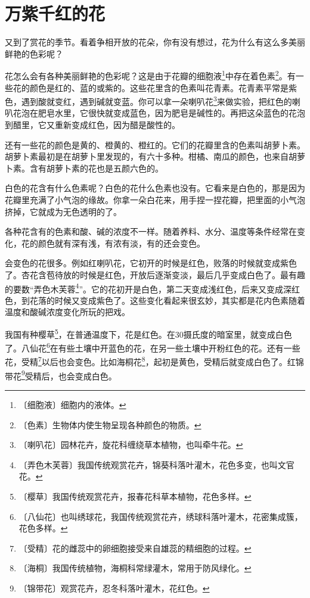 \documentclass[12pt,UTF-8,openany]{ctexbook}
\begin{document}
\chapter{万紫千红的花}

\begin{normalsize}
    
    又到了赏花的季节。看着争相开放的花朵，你有没有想过，花为什么有这么多美丽鲜艳的色彩呢？
    
    花怎么会有各种美丽鲜艳的色彩呢？这是由于花瓣的细胞液\footnote{〔细胞液〕细胞内的液体。}中存在着色素\footnote{〔色素〕生物体内使生物呈现各种颜色的物质。}。有一些花的颜色是红的、蓝的或紫的。这些花里含的色素叫花青素。花青素平常是紫色，遇到酸就变红，遇到碱就变蓝。你可以拿一朵喇叭花\footnote{〔喇叭花〕园林花卉，旋花科缠绕草本植物，也叫牵牛花。}来做实验，把红色的喇叭花泡在肥皂水里，它很快就变成蓝色，因为肥皂是碱性的。再把这朵蓝色的花泡到醋里，它又重新变成红色，因为醋是酸性的。
    
    还有一些花的颜色是黄的、橙黄的、橙红的。它们的花瓣里含的色素叫胡萝卜素。胡萝卜素最初是在胡萝卜里发现的，有六十多种。柑橘、南瓜的颜色，也来自胡萝卜素。含有胡萝卜素的花也是五颜六色的。
    
    白色的花含有什么色素呢？白色的花什么色素也没有。它看来是白色的，那是因为花瓣里充满了小气泡的缘故。你拿一朵白花来，用手捏一捏花瓣，把里面的小气泡挤掉，它就成为无色透明的了。
    
    各种花含有的色素和酸、碱的浓度不一样。随着养料、水分、温度等条件经常在变化，花的颜色就有深有浅，有浓有淡，有的还会变色。
    
    会变色的花很多。例如红喇叭花，它初开的时候是红色，败落的时候就变成紫色了。杏花含苞待放的时候是红色，开放后逐渐变淡，最后几乎变成白色了。最有趣的要数“弄色木芙蓉\footnote{〔弄色木芙蓉〕我国传统观赏花卉，锦葵科落叶灌木，花色多变，也叫文官花。}”。它的花初开是白色，第二天变成浅红色，后来又变成深红色，到花落的时候又变成紫色了。这些变化看起来很玄妙，其实都是花内色素随着温度和酸碱浓度变化所玩的把戏。
    
    我国有种樱草\footnote{〔樱草〕我国传统观赏花卉，报春花科草本植物，花色多样。}，在普通温度下，花是红色。在30摄氏度的暗室里，就变成白色了。八仙花\footnote{〔八仙花〕也叫绣球花，我国传统观赏花卉，绣球科落叶灌木，花密集成簇，花色多样。}在有些土壤中开蓝色的花，在另一些土壤中开粉红色的花。还有一些花，受精\footnote{〔受精〕花的雌蕊中的卵细胞接受来自雄蕊的精细胞的过程。}以后也会变色。比如海桐花\footnote{〔海桐〕我国传统植物，海桐科常绿灌木，常用于防风绿化。}，起初是黄色，受精后就变成白色了。红锦带花\footnote{〔锦带花〕观赏花卉，忍冬科落叶灌木，花红色。}受精后，也会变成白色。
    

\end{normalsize}
\end{document}
